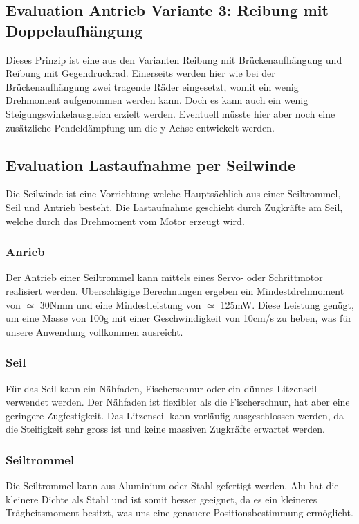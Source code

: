 \documentclass[a4paper]{report}
\begin{document}
\subsection{Evaluation Antrieb Variante 3: Reibung mit Doppelaufhängung}

Dieses Prinzip ist eine aus den Varianten Reibung mit Brückenaufhängung und Reibung mit Gegendruckrad. Einerseits werden hier wie bei der Brückenaufhängung zwei tragende Räder eingesetzt, womit ein wenig Drehmoment aufgenommen werden kann. Doch es kann auch ein wenig Steigungswinkelausgleich erzielt werden. Eventuell müsste hier aber noch eine zusätzliche Pendeldämpfung um die y-Achse entwickelt werden.


\subsection{Evaluation Lastaufnahme per Seilwinde}
Die Seilwinde ist eine Vorrichtung welche Hauptsächlich aus einer Seiltrommel, Seil und Antrieb besteht. Die Lastaufnahme geschieht durch Zugkräfte am Seil, welche durch das Drehmoment vom Motor erzeugt wird.
	\subsubsection{Anrieb}
	Der Antrieb einer Seiltrommel kann mittels eines Servo- oder Schrittmotor realisiert werden. Überschlägige Berechnungen ergeben ein Mindestdrehmoment von $\simeq$ 30Nmm und eine Mindestleistung von $\simeq$ 125mW. Diese Leistung genügt, um eine Masse von 100g mit einer Geschwindigkeit von 10cm/s zu heben, was für unsere Anwendung vollkommen ausreicht.

	\subsubsection{Seil}
	Für das Seil kann ein Nähfaden, Fischerschnur oder ein dünnes Litzenseil verwendet werden. Der Nähfaden ist flexibler als die Fischerschnur, hat aber eine geringere Zugfestigkeit. Das Litzenseil kann vorläufig ausgeschlossen werden, da die Steifigkeit sehr gross ist und keine massiven Zugkräfte erwartet werden.

	\subsubsection{Seiltrommel}
	Die Seiltrommel kann aus Aluminium oder Stahl gefertigt werden. Alu hat die kleinere Dichte als Stahl und ist somit besser geeignet, da es ein kleineres Trägheitsmoment besitzt, was uns eine genauere Positionsbestimmung ermöglicht.
\end{document}

